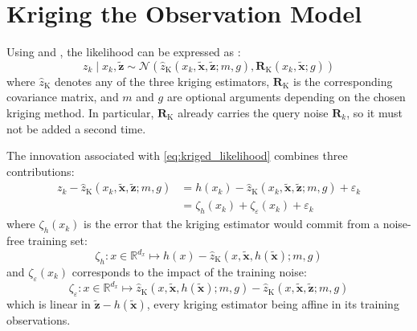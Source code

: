 \section{Kriging the Observation Model}\label{sec:kriging_PF}

Using  and , the likelihood can be expressed as \cite{bib:GP-BayesFilters,bib:magnetic-GP-PF}:
\begin{equation}
	z_k\mid x_k,\tilde{\mathbf{z}}\sim\mathcal{N}\left(\hat{z}_{\mathrm{K}}(x_k,\tilde{\mathbf{x}},\tilde{\mathbf{z}};m,g),\mathbf{R}_{\mathrm{K}}(x_k,\tilde{\mathbf{x}};g)\right)\label{eq:kriged_likelihood}
\end{equation}
where $\hat{z}_{\mathrm{K}}$ denotes any of the three kriging estimators, $\mathbf{R}_{\mathrm{K}}$ is the corresponding covariance matrix, and $m$ and $g$ are optional arguments depending on the chosen kriging method. In particular, $\mathbf{R}_{\mathrm{K}}$ already carries the query noise $\mathbf{R}_k$, so it must not be added a second time.

The innovation associated with \eqref{eq:kriged_likelihood} combines three contributions:
\begin{equation}
	\begin{aligned}
	z_k-\hat{z}_{\mathrm{K}}(x_k,\tilde{\mathbf{x}},\tilde{\mathbf{z}};m,g)&=h(x_k)-\hat{z}_{\mathrm{K}}(x_k,\tilde{\mathbf{x}},\tilde{\mathbf{z}};m,g)+\varepsilon_k\\
	&=\zeta_h(x_k)+\zeta_\varepsilon(x_k)+\varepsilon_k
	\end{aligned}
\end{equation}
where $\zeta_h(x_k)$ is the error that the kriging estimator would commit from a noise-free training set:
\begin{equation}
	\zeta_h:x\in\mathbb{R}^{d_x}\mapsto h(x)-\hat{z}_{\mathrm{K}}\left(x,\tilde{\mathbf{x}},h(\tilde{\mathbf{x}});m,g\right)
\end{equation}
and $\zeta_\varepsilon(x_k)$ corresponds to the impact of the training noise:
\begin{equation}
	\zeta_\varepsilon:x\in\mathbb{R}^{d_x}\mapsto\hat{z}_{\mathrm{K}}\left(x,\tilde{\mathbf{x}},h(\tilde{\mathbf{x}});m,g\right)-\hat{z}_{\mathrm{K}}(x,\tilde{\mathbf{x}},\tilde{\mathbf{z}};m,g)
\end{equation}
which is linear in $\tilde{\mathbf{z}}-h(\tilde{\mathbf{x}})$, every kriging estimator being affine in its training observations.

